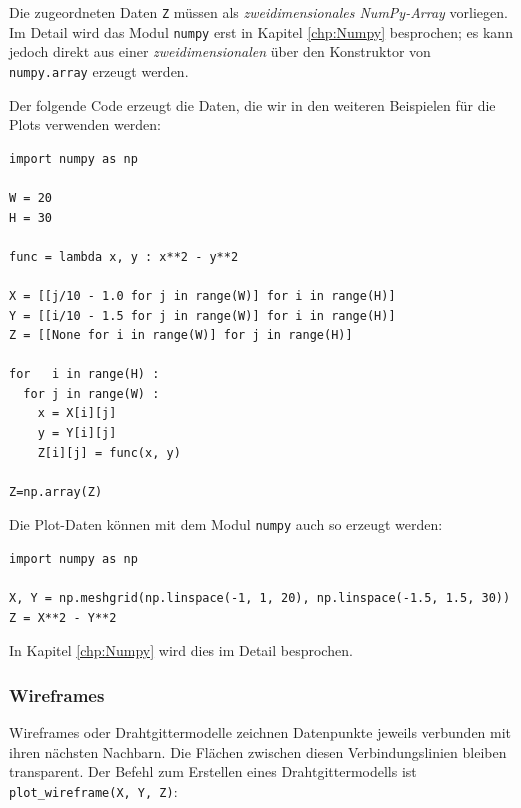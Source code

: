 Die zugeordneten Daten \texttt{Z} müssen als \emph{zweidimensionales NumPy-Array} vorliegen. Im Detail wird das Modul \texttt{numpy} erst in Kapitel \ref{chp:Numpy} besprochen; es kann jedoch direkt aus einer \emph{zweidimensionalen}  über den Konstruktor von \texttt{numpy.array} erzeugt werden.

Der folgende Code erzeugt die Daten, die wir in den weiteren Beispielen für die Plots verwenden werden:
\begin{codebox}
\begin{verbatim}
import numpy as np

W = 20
H = 30

func = lambda x, y : x**2 - y**2

X = [[j/10 - 1.0 for j in range(W)] for i in range(H)]
Y = [[i/10 - 1.5 for j in range(W)] for i in range(H)]
Z = [[None for i in range(W)] for j in range(H)]

for   i in range(H) :
  for j in range(W) :
    x = X[i][j]
    y = Y[i][j]
    Z[i][j] = func(x, y)

Z=np.array(Z)
\end{verbatim}
\end{codebox}

\begin{tcolorbox}[title=Sneak Preview: NumPy]
Die Plot-Daten können mit dem Modul \texttt{numpy} auch so erzeugt werden:

\vspace{6pt}
\begin{codebox}
\begin{verbatim}
import numpy as np

X, Y = np.meshgrid(np.linspace(-1, 1, 20), np.linspace(-1.5, 1.5, 30))
Z = X**2 - Y**2
\end{verbatim}
\end{codebox}

In Kapitel \ref{chp:Numpy} wird dies im Detail besprochen.
\end{tcolorbox}

\subsubsection{Wireframes}
Wireframes oder Drahtgittermodelle zeichnen Datenpunkte jeweils verbunden mit ihren nächsten Nachbarn. Die Flächen zwischen diesen Verbindungslinien bleiben transparent. Der Befehl zum Erstellen eines Drahtgittermodells ist \texttt{plot\_wireframe(X, Y, Z)}:

